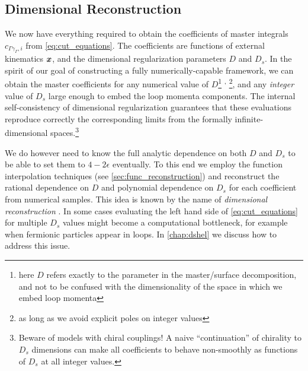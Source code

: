 \subsection{Dimensional Reconstruction}

We now have everything required to obtain the coefficients of master integrals 
$c_{\Gamma\gamma_\Gamma,i}$ from  \cref{eq:cut_equations}.  
The coefficients are functions of external kinematics $\vb*{x}$, and the dimensional regularization parameters $D$ and $D_s$.
In the spirit of our goal of constructing a fully numerically-capable framework, 
we can obtain the master coefficients
for any numerical value of $D$\footnote{
  here $D$ refers exactly to the parameter in the master/surface decomposition,
  and  not to be confused with the dimensionality of the space in which we embed loop momenta
}%
\textsuperscript{,}%
\footnote{as long as we avoid explicit poles on integer values},
and any  \emph{integer} value of $D_s$ large enough to embed the loop momenta components.
The internal self-consistency of dimensional regularization guarantees
that these evaluations reproduce correctly the corresponding limits from the formally infinite-dimensional spaces.\footnote{
  Beware of models with chiral couplings! A naive ``continuation'' of chirality to $D_s$ dimensions
  can make all coefficients to behave non-smoothly as functions of $D_s$ at all integer values.
}

We do however need to know the full analytic dependence on both $D$ and $D_s$ to be able
to set them to $4-2\epsilon$ eventually.
To this end we employ the function interpolation techniques (see \cref{sec:func_reconstruction})
and reconstruct the rational dependence on $D$ and polynomial dependence on $D_s$ for each coefficient from numerical samples.
This idea is known by the name of
\emph{dimensional reconstruction} \cite{Giele:2008ve,Ellis:2008ir,Boughezal:2011br,Abreu:2017xsl,Abreu:2017hqn}.
In some cases evaluating the left hand side of \cref{eq:cut_equations} for multiple $D_s$ values might become a computational bottleneck,
for example when fermionic particles appear in loops. In \cref{chap:dshel} we discuss how to address this issue.

